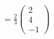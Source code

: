 \documentclass[preview]{standalone}
\begin{document}
\begin{align*}
=\frac{2}{3}\begin{pmatrix} 2 \\ 4 \\ -1 \end{pmatrix}
\end{align*}
\end{document}
